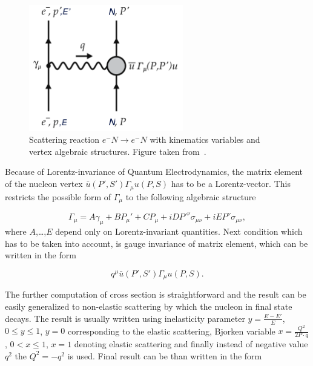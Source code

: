 \begin{figure}
  \centering
  \includegraphics[width=0.6\textwidth]{Chapter1/Scattering.png} 
  \caption[Scattering reaction $e^-N \rightarrow e^-N$ with kinematics variables
          and vertex algebraic structures.]
          {Scattering reaction $e^-N \rightarrow
          e^-N$ with kinematics variables and vertex algebraic structures.
          Figure taken from~\cite{QCDTextbook}.}
  \label{fig:Scattering}
\end{figure}

Because of Lorentz-invariance of Quantum Electrodynamics, the matrix
element of the nucleon vertex $\bar{u}(P',S')\Gamma_\mu u(P,S)$ has to be a
Lorentz-vector. This restricts the possible form of $\Gamma_\mu$ to the
following algebraic structure

\begin{equation}
  \Gamma_\mu = A \gamma_\mu + B P_\mu' + C P_\mu + i D P'^\nu \sigma_{\mu\nu}
    + i E P^\nu \sigma_{\mu\nu},
  \label{eq:ScatteringAlgebraicMatrix}
\end{equation}
where $A$,\dots,$E$ depend only on Lorentz-invariant quantities. Next condition
which has to be taken into account, is gauge invariance of matrix element, which
can be written in the form

\begin{equation}
  q^\mu \bar{u}(P',S')\Gamma_\mu u(P,S).
  \label{eq:ScatteringGaugeInvariance}
\end{equation}

The further computation of cross section is straightforward and the result can
be easily generalized to non-elastic scattering by which the nucleon in final
state decays. The result is usually written using inelasticity parameter
$y=\frac{E-E'}{E}$, $0 \leq y \leq 1$, $y=0$ corresponding to the elastic
scattering, Bjorken variable $ x = \frac{Q^2}{2 P \cdot q}$, $ 0 < x \leq 1$, $x
= 1$ denoting elastic scattering and finally instead of negative value $q^2$ the
$Q^2 = -q^2$ is used. Final result can be than written in the form

